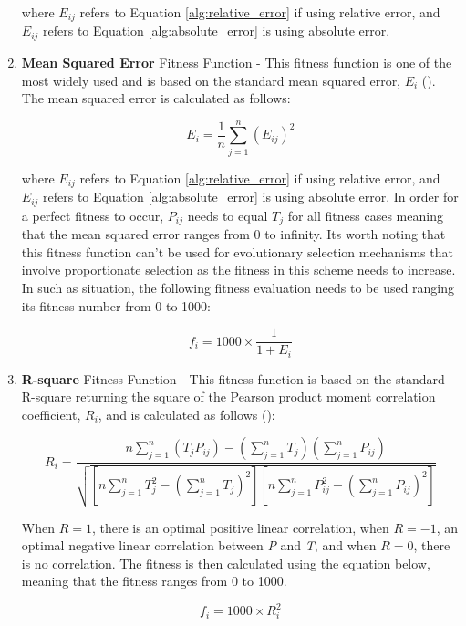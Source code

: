 \begin{enumerate}
    \noindent where $E_{ij}$ refers to Equation \ref{alg:relative_error} if using relative error, and $E_{ij}$ refers to Equation \ref{alg:absolute_error} is using absolute error.

    \item \textbf{Mean Squared Error} Fitness Function - This fitness function is one of the most widely used and is based on the standard mean squared error, \textit{$E_i$} (\cite{ferreira2006gene}). The mean squared error is calculated as follows:

    \begin{equation}\label{alg:mean_square_error}
        E_i = \frac{1}{n}\sum_{j=1}^{n}(E_{ij})^2
    \end{equation}

    \noindent where $E_{ij}$ refers to Equation \ref{alg:relative_error} if using relative error, and $E_{ij}$ refers to Equation \ref{alg:absolute_error} is using absolute error. In order for a perfect fitness to occur, \textit{$P_{ij}$} needs to equal \textit{$T_j$} for all fitness cases meaning that the mean squared error ranges from 0 to infinity. Its worth noting that this fitness function can't be used for evolutionary selection mechanisms that involve proportionate selection as the fitness in this scheme needs to increase. In such as situation, the following fitness evaluation needs to be used ranging its fitness number from 0 to 1000:

    \begin{equation}\label{alg:mean_square_error_fitness}
        f_i = 1000 \times \frac{1}{1 + E_i}
    \end{equation}

    \item \textbf{R-square} Fitness Function - This fitness function is based on the standard R-square returning the square of the Pearson product moment correlation coefficient, \textit{$R_i$}, and is calculated as follows (\cite{ferreira2006gene}):
    
    \begin{equation}\label{alg:r_square}
        R_i = \frac{n\sum_{j=1}^{n}(T_jP_{ij}) - (\sum_{j=1}^{n}T_j)(\sum_{j=1}^{n}P_{ij})}{\sqrt{[n\sum_{j=1}^{n}T_j^2 - (\sum_{j=1}^{n}T_j)^2][n\sum_{j=1}^{n}P_{ij}^2 - (\sum_{j=1}^{n}P_{ij})^2]}}
    \end{equation}

    \noindent When $R=1$, there is an optimal positive linear correlation, when $R=-1$, an optimal negative linear correlation between \textit{P} and \textit{T}, and when $R=0$, there is no correlation. The fitness is then calculated using the equation below, meaning that the fitness ranges from 0 to 1000.

    \begin{equation}\label{alg:r_square}
        f_i = 1000 \times R_i^2
    \end{equation}
\end{enumerate}

